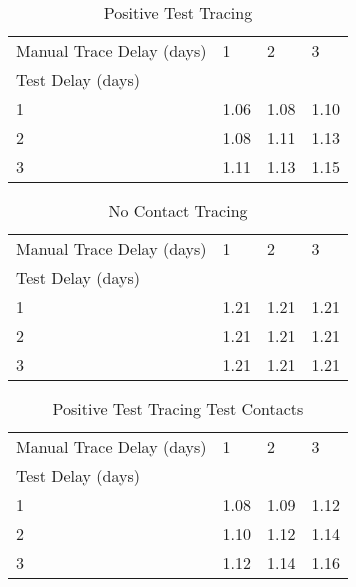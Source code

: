 \documentclass{article}
\begin{document}
    \begin{table}[H]
         \begin{tabular}{llll}
\toprule
Manual Trace Delay (days) &     1 &     2 &     3 \\
Test Delay (days) &       &       &       \\
\midrule
1                 &  1.06 &  1.08 &  1.10 \\
2                 &  1.08 &  1.11 &  1.13 \\
3                 &  1.11 &  1.13 &  1.15 \\
\bottomrule
\end{tabular}

        \caption{Positive Test Tracing}
    \end{table}
    


    \begin{table}[H]
         \begin{tabular}{llll}
\toprule
Manual Trace Delay (days) &     1 &     2 &     3 \\
Test Delay (days) &       &       &       \\
\midrule
1                 &  1.21 &  1.21 &  1.21 \\
2                 &  1.21 &  1.21 &  1.21 \\
3                 &  1.21 &  1.21 &  1.21 \\
\bottomrule
\end{tabular}

        \caption{No Contact Tracing}
    \end{table}
    


    \begin{table}[H]
         \begin{tabular}{llll}
\toprule
Manual Trace Delay (days) &     1 &     2 &     3 \\
Test Delay (days) &       &       &       \\
\midrule
1                 &  1.08 &  1.09 &  1.12 \\
2                 &  1.10 &  1.12 &  1.14 \\
3                 &  1.12 &  1.14 &  1.16 \\
\bottomrule
\end{tabular}

        \caption{Positive Test Tracing Test Contacts}
    \end{table}
    

\clearpage
\end{document}
